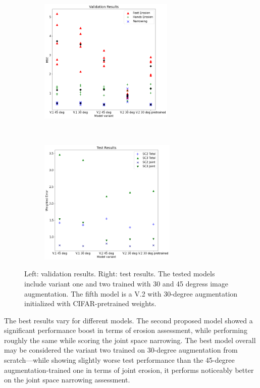 \documentclass[thesis=B,english]{FITthesis}[2019/12/23]
\begin{document}
\begin{figure}
	\centering
	\begin{subfigure}[b]{.48\textwidth}
		\centering
		\includegraphics[height=6cm]{images/validation_results.png}
	\end{subfigure}
	~
	\begin{subfigure}[b]{.48\textwidth}
		\centering
		\includegraphics[height=6cm]{images/test_results.png}
	\end{subfigure}
	
	\caption{Left: validation results. Right: test results. The tested models include variant one and two trained with 30 and 45 degress image augmentation. The fifth model is a V.2 with 30-degree augmentation initialized with CIFAR-pretrained weights.}
\end{figure}

The best results vary for different models. The second proposed model showed a significant performance boost in terms of erosion assessment, while performing roughly the same while scoring the joint space narrowing. The best model overall may be considered the variant two trained on 30-degree augmentation from scratch---while showing slightly worse test performance than the 45-degree augmentation-trained one in terms of joint erosion, it performs noticeably better on the joint space narrowing assessment.
\end{document}
